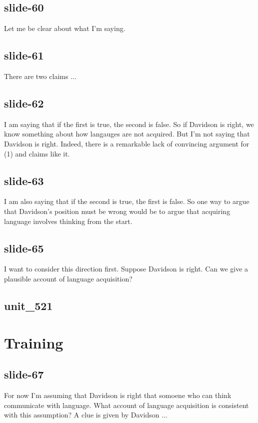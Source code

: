 \documentclass[12pt,\papersize]{extarticle}
\begin{document}
 
\subsection{slide-60}
Let me be clear about what I'm saying.
 
 
\subsection{slide-61}
There are two claims ...
 
 
\subsection{slide-62}
I am saying that if the first is true, the second is false.
So if Davidson is right, we know something about how langauges are not acquired.
But I'm not saying that Davidson is right.
Indeed, there is a remarkable lack of convincing argument for (1) and claims like it.
 
 
\subsection{slide-63}
I am also saying that if the second is true, the first is false.
So one way to argue that Davidson's position must be wrong would be to argue that acquiring language involves thinking from the start.
 
 
\subsection{slide-65}
I want to consider this direction first.
Suppose Davidson is right. Can we give a plausible account of language acquisition?
 
 
\subsection{unit\_521}
 
\section{Training}
 
 
\subsection{slide-67}
For now I'm assuming that Davidson is right that somoene who can think communicate with language.
What account of language acquisition is consistent with this assumption?
A clue is given by Davidson ...
 
\end{document}
